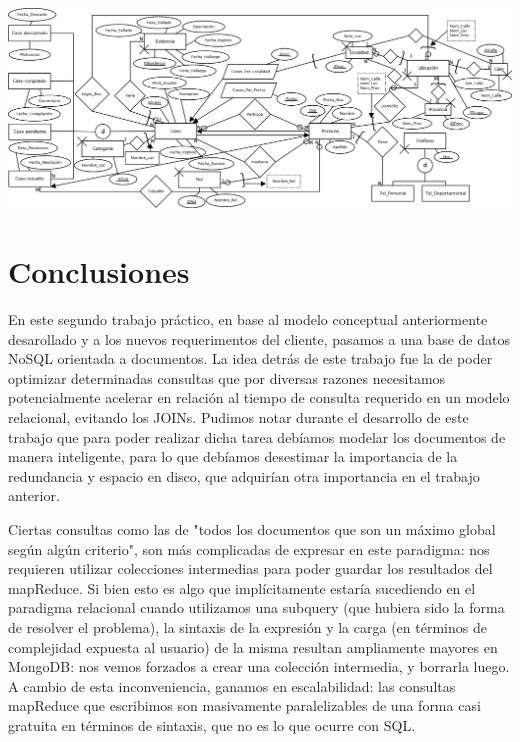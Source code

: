 \documentclass{article}
\theoremstyle{definition}
\theoremstyle{remark}
\begin{document}
\includegraphics[width=\textheight,height=\textwidth*9/10,angle=90]{DID.png}

\section{Conclusiones}

En este segundo trabajo práctico, en base al modelo conceptual anteriormente desarollado y a los nuevos requerimentos del cliente, pasamos a una base de datos NoSQL orientada a documentos. La idea detrás de este trabajo fue la de poder optimizar determinadas consultas que por diversas razones necesitamos potencialmente acelerar en relación al tiempo de consulta requerido en un modelo relacional, evitando los JOINs. Pudimos notar durante el desarrollo de este trabajo que para poder realizar dicha tarea debíamos modelar los documentos de manera inteligente, para lo que debíamos desestimar la importancia de la redundancia y espacio en disco, que adquirían otra importancia en el trabajo anterior.

Ciertas consultas como las de "todos los documentos que son un máximo global según algún criterio", son más complicadas de expresar en este paradigma: nos requieren utilizar colecciones intermedias para poder guardar los resultados del mapReduce. Si bien esto es algo que implícitamente estaría sucediendo en el paradigma relacional cuando utilizamos una subquery (que hubiera sido la forma de resolver el problema), la sintaxis de la expresión y la carga (en términos de complejidad expuesta al usuario) de la misma resultan ampliamente mayores en MongoDB: nos vemos forzados a crear una colección intermedia, y borrarla luego. A cambio de esta inconveniencia, ganamos en escalabilidad: las consultas mapReduce que escribimos son masivamente paralelizables de una forma casi gratuita en términos de sintaxis, que no es lo que ocurre con SQL.
\end{document}
